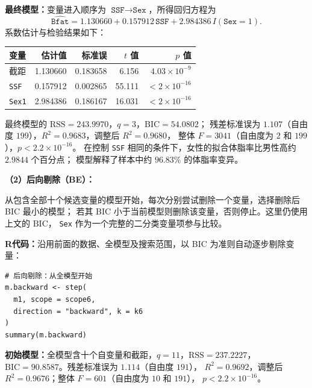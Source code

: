 \documentclass[12pt,a4paper]{article}
\begin{document}
\begin{answerbox}
\textbf{最终模型：}变量进入顺序为 $\texttt{SSF}\to\texttt{Sex}$，所得回归方程为
$$
\boxed{\widehat{\texttt{Bfat}}=1.130660+0.157912\,\texttt{SSF}+2.984386\,I(\texttt{Sex}=1).}
$$
系数估计与检验结果如下：
\begin{center}
\small
\begin{tabular}{lrrrr}
\toprule
变量 & 估计值 & 标准误 & $t$ 值 & $p$ 值 \\
\midrule
截距 & 1.130660 & 0.183658 & 6.156 & $4.03\times10^{-9}$ \\
\texttt{SSF} & 0.157912 & 0.002865 & 55.111 & $<2\times10^{-16}$ \\
\texttt{Sex1} & 2.984386 & 0.186167 & 16.031 & $<2\times10^{-16}$ \\
\bottomrule
\end{tabular}
\end{center}
最终模型的 $\mathrm{RSS}=243.9970$，$q=3$，$\boxed{\mathrm{BIC}=54.0802}$；
残差标准误为 $1.107$（自由度 $199$），$R^2=0.9683$，调整后 $R^2=0.9680$，
整体 $F=3041$（自由度为 $2$ 和 $199$），$p<2.2\times10^{-16}$。
在控制 \texttt{SSF} 相同的条件下，女性的拟合体脂率比男性高约 $2.9844$ 个百分点；
模型解释了样本中约 $96.83\%$ 的体脂率变异。

\textbf{（2）后向剔除（BE）：}

从包含全部十个候选变量的模型开始，每次分别尝试删除一个变量，选择删除后 BIC 最小的模型；
若其 BIC 小于当前模型则删除该变量，否则停止。这里仍使用上文的 $\mathrm{BIC}$，
\texttt{Sex} 作为一个完整的二分类变量项参与比较。

\textbf{R代码：}沿用前面的数据、全模型及搜索范围，以 BIC 为准则自动逐步剔除变量：
\begin{lstlisting}[style=rcode]
# 后向剔除：从全模型开始
m.backward <- step(
  m1, scope = scope6,
  direction = "backward", k = k6
)
summary(m.backward)
\end{lstlisting}

\textbf{初始模型：}全模型含十个自变量和截距，$q=11$，$\mathrm{RSS}=237.2227$，
$\mathrm{BIC}=90.8587$。残差标准误为 $1.114$（自由度 $191$），
$R^2=0.9692$，调整后 $R^2=0.9676$；整体 $F=601$（自由度为 $10$ 和 $191$），
$p<2.2\times10^{-16}$。


\end{answerbox}
\end{document}
